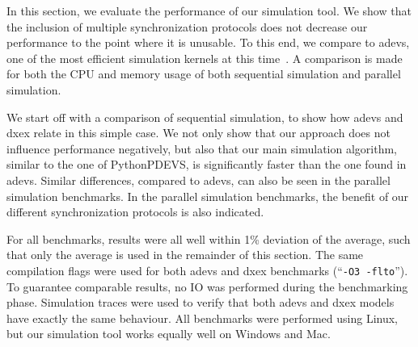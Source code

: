 In this section, we evaluate the performance of our simulation tool.
We show that the inclusion of multiple synchronization protocols does not decrease our performance to the point where it is unusable.
To this end, we compare to adevs, one of the most efficient simulation kernels at this time~\cite{DEVSSurvey}.
A comparison is made for both the CPU and memory usage of both sequential simulation and parallel simulation.

We start off with a comparison of sequential simulation, to show how adevs and dxex relate in this simple case.
We not only show that our approach does not influence performance negatively, but also that our main simulation algorithm, similar to the one of PythonPDEVS, is significantly faster than the one found in adevs.
Similar differences, compared to adevs, can also be seen in the parallel simulation benchmarks.
In the parallel simulation benchmarks, the benefit of our different synchronization protocols is also indicated.

For all benchmarks, results were all well within 1\% deviation of the average, such that only the average is used in the remainder of this section.
The same compilation flags were used for both adevs and dxex benchmarks (``\texttt{-O3 -flto}'').
To guarantee comparable results, no IO was performed during the benchmarking phase.
Simulation traces were used to verify that both adevs and dxex models have exactly the same behaviour.
All benchmarks were performed using Linux, but our simulation tool works equally well on Windows and Mac.

